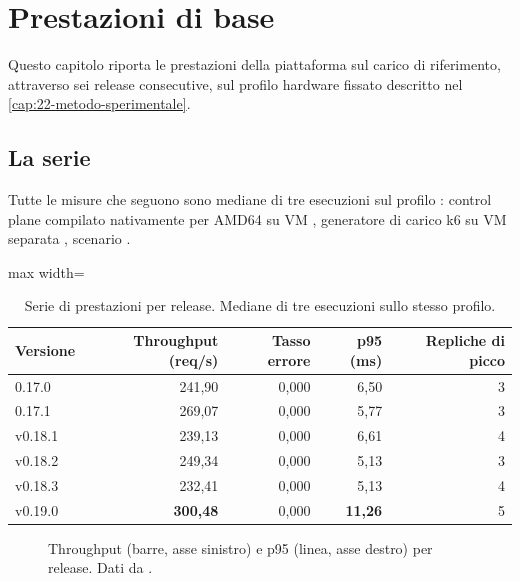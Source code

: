 \chapter{Prestazioni di base}
\label{cap:23-prestazioni-base}

Questo capitolo riporta le prestazioni della piattaforma sul carico di
riferimento, attraverso sei release consecutive, sul profilo hardware fissato
descritto nel \cref{cap:22-metodo-sperimentale}.

\section{La serie}

Tutte le misure che seguono sono mediane di tre esecuzioni sul profilo
: control plane compilato
nativamente per AMD64 su VM , generatore di carico k6 su
VM separata , scenario .

\begin{table}[htbp]
\centering
\caption{Serie di prestazioni per release. Mediane di tre esecuzioni sullo
stesso profilo.}
\label{tab:serie}
\small
\begin{adjustbox}{max width=\textwidth}
\begin{tabular}{@{}lrrrr@{}}
\toprule
\textbf{Versione} & \textbf{Throughput (req/s)} & \textbf{Tasso errore} &
\textbf{p95 (ms)} & \textbf{Repliche di picco} \\
\midrule
0.17.0  & 241{,}90 & 0{,}000 & 6{,}50  & 3 \\
0.17.1  & 269{,}07 & 0{,}000 & 5{,}77  & 3 \\
v0.18.1 & 239{,}13 & 0{,}000 & 6{,}61  & 4 \\
v0.18.2 & 249{,}34 & 0{,}000 & 5{,}13  & 3 \\
v0.18.3 & 232{,}41 & 0{,}000 & 5{,}13  & 4 \\
v0.19.0 & \textbf{300{,}48} & 0{,}000 & \textbf{11{,}26} & 5 \\
\bottomrule
\end{tabular}
\end{adjustbox}
\end{table}

\begin{figure}[htbp]
  \centering
  \resizebox{0.95\textwidth}{!}{}
  \caption{Throughput (barre, asse sinistro) e p95 (linea, asse destro) per
  release. Dati da .}
  \label{fig:serie}
\end{figure}

